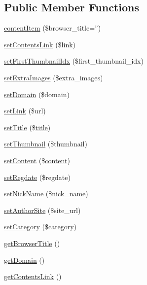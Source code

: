 \subsection*{Public Member Functions}
\begin{DoxyCompactItemize}
\item 
\hyperlink{classcontentItem_a6d43634cb803585fa2a0feb13f63fad4}{content\+Item} (\$browser\+\_\+title='')
\item 
\hyperlink{classcontentItem_afe78ae4ab14d74305c86d27570d9a7f8}{set\+Contents\+Link} (\$link)
\item 
\hyperlink{classcontentItem_ab18307a6068a6cdde94369976fe730f4}{set\+First\+Thumbnail\+Idx} (\$first\+\_\+thumbnail\+\_\+idx)
\item 
\hyperlink{classcontentItem_a8f635dff719c18bf5e969b13ca901c74}{set\+Extra\+Images} (\$extra\+\_\+images)
\item 
\hyperlink{classcontentItem_a61b6be878a0183cd1c3dfde8f29d5c20}{set\+Domain} (\$domain)
\item 
\hyperlink{classcontentItem_aad5f15eead8728ad5e2636740c4ff145}{set\+Link} (\$url)
\item 
\hyperlink{classcontentItem_a5a29426d7878c413cd6d63e930ce0a0f}{set\+Title} (\$\hyperlink{ko_8install_8php_a5b072c5fd1d2228c6ba5cee13cd142e3}{title})
\item 
\hyperlink{classcontentItem_a0145a758535658fa776871bfd675be15}{set\+Thumbnail} (\$thumbnail)
\item 
\hyperlink{classcontentItem_ad7355ad724398f4fbc79832241767405}{set\+Content} (\$\hyperlink{classcontent}{content})
\item 
\hyperlink{classcontentItem_abb2dad632dd405213708d5c211518c82}{set\+Regdate} (\$regdate)
\item 
\hyperlink{classcontentItem_ae3175aa0291e75bf95cb1220e50a33e4}{set\+Nick\+Name} (\$\hyperlink{ko_8install_8php_a151ecae87a1f3d7e257aa089803086bd}{nick\+\_\+name})
\item 
\hyperlink{classcontentItem_af28f4f40f1ac95cee2d88fe1e7d4b683}{set\+Author\+Site} (\$site\+\_\+url)
\item 
\hyperlink{classcontentItem_aa8ba578ae6629d632a42a76da823c59f}{set\+Category} (\$category)
\item 
\hyperlink{classcontentItem_a1590559deb019ba22a637cf78408f242}{get\+Browser\+Title} ()
\item 
\hyperlink{classcontentItem_a7a513d119938877566418029c6124a45}{get\+Domain} ()
\item 
\hyperlink{classcontentItem_a80a161de842f1a890fdbfee439674881}{get\+Contents\+Link} ()

\end{DoxyCompactItemize}
